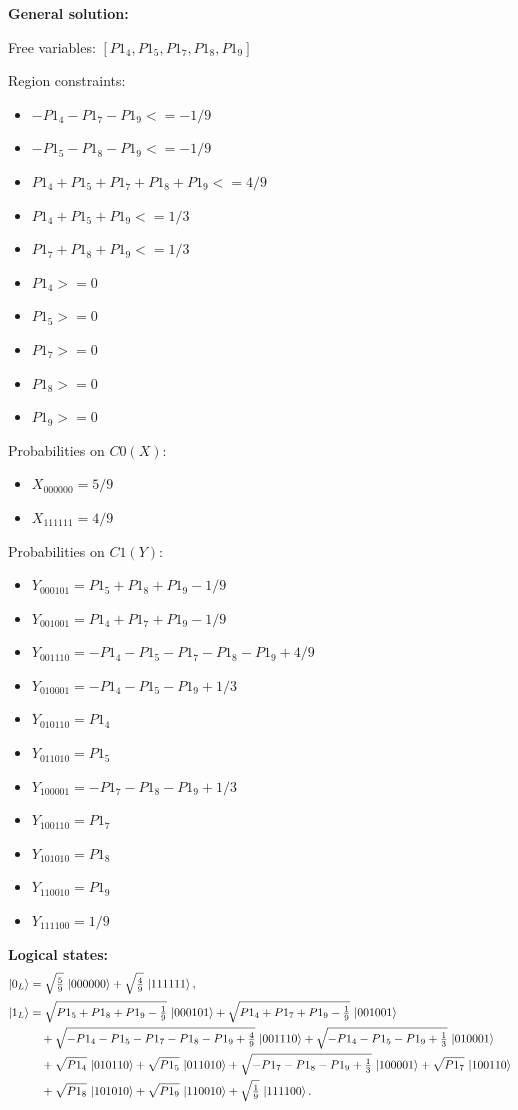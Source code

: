 \documentclass[11pt]{article}
\begin{document}
\noindent\textbf{General solution:}

Free variables: $[P1_4, P1_5, P1_7, P1_8, P1_9]$

Region constraints:
\begin{itemize}
    \item $-P1_4 - P1_7 - P1_9 <= -1/9$
    \item $-P1_5 - P1_8 - P1_9 <= -1/9$
    \item $P1_4 + P1_5 + P1_7 + P1_8 + P1_9 <= 4/9$
    \item $P1_4 + P1_5 + P1_9 <= 1/3$
    \item $P1_7 + P1_8 + P1_9 <= 1/3$
    \item $P1_4 >= 0$
    \item $P1_5 >= 0$
    \item $P1_7 >= 0$
    \item $P1_8 >= 0$
    \item $P1_9 >= 0$
\end{itemize}

Probabilities on $C0 (X)$:
\begin{itemize}
    \item $X_{000000} = 5/9$
    \item $X_{111111} = 4/9$
\end{itemize}

Probabilities on $C1 (Y)$:
\begin{itemize}
    \item $Y_{000101} = P1_5 + P1_8 + P1_9 - 1/9$
    \item $Y_{001001} = P1_4 + P1_7 + P1_9 - 1/9$
    \item $Y_{001110} = -P1_4 - P1_5 - P1_7 - P1_8 - P1_9 + 4/9$
    \item $Y_{010001} = -P1_4 - P1_5 - P1_9 + 1/3$
    \item $Y_{010110} = P1_4$
    \item $Y_{011010} = P1_5$
    \item $Y_{100001} = -P1_7 - P1_8 - P1_9 + 1/3$
    \item $Y_{100110} = P1_7$
    \item $Y_{101010} = P1_8$
    \item $Y_{110010} = P1_9$
    \item $Y_{111100} = 1/9$
\end{itemize}

\noindent\textbf{Logical states:}
\begin{align*}
\ket{0_L} &= \sqrt{\tfrac{5}{9}}\,\ket{000000} + \sqrt{\tfrac{4}{9}}\,\ket{111111},
\\[2pt]
\ket{1_L} &= \sqrt{P1_5 + P1_8 + P1_9 - \tfrac{1}{9}}\,\ket{000101} + \sqrt{P1_4 + P1_7 + P1_9 - \tfrac{1}{9}}\,\ket{001001}\\
&\quad + \sqrt{-P1_4 - P1_5 - P1_7 - P1_8 - P1_9 + \tfrac{4}{9}}\,\ket{001110} + \sqrt{-P1_4 - P1_5 - P1_9 + \tfrac{1}{3}}\,\ket{010001}\\
&\quad + \sqrt{P1_4}\,\ket{010110} + \sqrt{P1_5}\,\ket{011010} + \sqrt{-P1_7 - P1_8 - P1_9 + \tfrac{1}{3}}\,\ket{100001} + \sqrt{P1_7}\,\ket{100110}\\
&\quad + \sqrt{P1_8}\,\ket{101010} + \sqrt{P1_9}\,\ket{110010} + \sqrt{\tfrac{1}{9}}\,\ket{111100}.
\end{align*}
\end{document}
